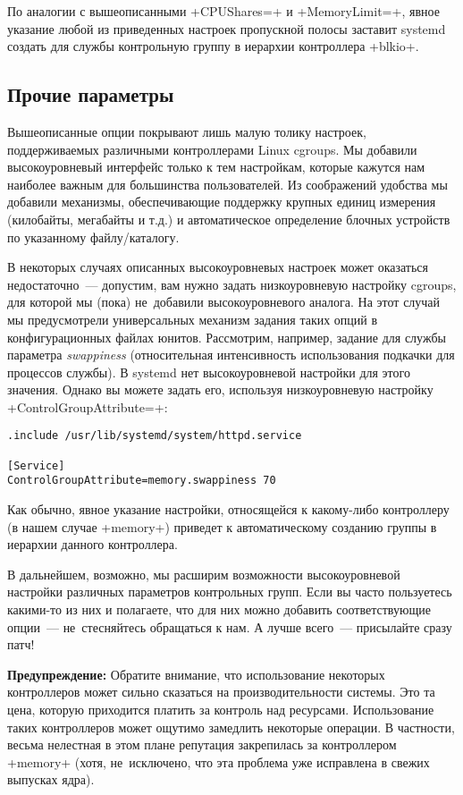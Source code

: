 \documentclass[10pt,oneside,a4paper]{article}
\newenvironment{caveat}[1][]{\smallskip\par\textbf{Предупреждение#1: }}%
	{\smallskip\par}
\begin{document}
По аналогии с вышеописанными +CPUShares=+ и +MemoryLimit=+, явное указание любой
из приведенных настроек пропускной полосы заставит systemd создать для службы
контрольную группу в иерархии контроллера +blkio+.

\subsection{Прочие параметры}

Вышеописанные опции покрывают лишь малую толику настроек, поддерживаемых
различными контроллерами Linux cgroups. Мы добавили высокоуровневый интерфейс
только к тем настройкам, которые кажутся нам наиболее важным для большинства
пользователей. Из соображений удобства мы добавили механизмы, обеспечивающие
поддержку крупных единиц измерения (килобайты, мегабайты и т.д.) и
автоматическое определение блочных устройств по указанному файлу/каталогу.

В некоторых случаях описанных высокоуровневых настроек может оказаться
недостаточно~--- допустим, вам нужно задать низкоуровневую настройку cgroups,
для которой мы (пока) не~добавили высокоуровневого аналога. На этот случай мы
предусмотрели универсальных механизм задания таких опций в конфигурационных 
файлах юнитов. Рассмотрим, например, задание для службы параметра
\emph{swappiness} (относительная интенсивность использования подкачки для
процессов службы). В systemd нет высокоуровневой настройки для этого значения.
Однако вы можете задать его, используя низкоуровневую настройку
+ControlGroupAttribute=+:
\begin{Verbatim}
.include /usr/lib/systemd/system/httpd.service

[Service]
ControlGroupAttribute=memory.swappiness 70
\end{Verbatim}
Как обычно, явное указание настройки, относящейся к какому-либо контроллеру (в
нашем случае +memory+) приведет к автоматическому созданию группы в иерархии
данного контроллера.

В дальнейшем, возможно, мы расширим возможности высокоуровневой настройки 
различных параметров контрольных групп. Если вы часто пользуетесь какими-то из
них и полагаете, что для них можно добавить соответствующие опции~---
не~стесняйтесь обращаться к нам. А лучше всего~--- присылайте сразу патч!

\begin{caveat}
	Обратите внимание, что использование некоторых контроллеров может сильно
	сказаться на производительности системы. Это та цена, которую приходится
	платить за контроль над ресурсами. Использование таких контроллеров
	может ощутимо замедлить некоторые операции. В частности, весьма
	нелестная в этом плане репутация закрепилась за контроллером +memory+
	(хотя, не~исключено, что эта проблема уже исправлена в свежих выпусках
	ядра).
\end{caveat}
\end{document}
